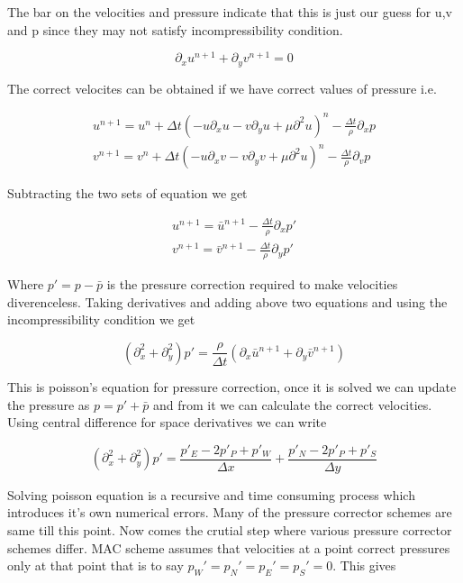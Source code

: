 \documentclass{article}		%
\begin{document}
The bar on the velocities and pressure indicate that this is just our guess for u,v and p since they may not satisfy incompressibility condition.  

\begin{equation}
\partial_x u^{n+1} + \partial_y v^{n+1} =0
\end{equation}

The correct velocites can be obtained if we have correct values of pressure i.e. 

\begin{eqnarray}
u^{n+1} = u^{n} + \Delta t \left( - u\partial_x u - v\partial_y u + \mu \partial^2 u \right)^n -  \frac{\Delta t}{\rho} \partial_x p \\
v^{n+1} = v^{n} + \Delta t \left( - u\partial_x v - v\partial_y v + \mu \partial^2 u \right)^n -  \frac{\Delta t}{\rho} \partial_v p 
\end{eqnarray}

Subtracting the two sets of equation we get 


\begin{eqnarray}
\label{uv}
u^{n+1} = \bar{u}^{n+1} - \frac{\Delta t}{\rho}\partial_x p'\\
v^{n+1} = \bar{v}^{n+1} - \frac{\Delta t}{\rho} \partial_y p'
\end{eqnarray}

Where $p' = p - \bar{p}$ is the pressure correction required to make velocities diverenceless. Taking derivatives and adding above two equations and using the incompressibility condition we get

\begin{equation}
 (\partial_x^2 + \partial_y^2) p'= \frac{\rho}{\Delta t}\left(\partial_x\bar{u}^{n+1} + \partial_y\bar{v}^{n+1}\right) 
\end{equation}

This is poisson's equation for pressure correction, once it is solved we can update the pressure as $p = p' + \bar{p} $ and from it we can calculate the correct velocities. Using central difference for space derivatives we can write 

\begin{equation}
(\partial_x^2 + \partial_y^2) p'=  \frac{p'_E - 2p'_P + p'_W}{\Delta x} + \frac{p'_N - 2p'_P + p'_S}{\Delta y}
\end{equation}

 Solving poisson equation is a recursive and time consuming process which introduces it's own numerical errors. Many of the pressure corrector schemes are same till this point.  Now comes the crutial step where various pressure corrector schemes differ. MAC scheme assumes that velocities at a point correct pressures only at that point that is to say $p_W' = p_N'= p_E'= p_S'=0$. This gives 
 
\end{document}
